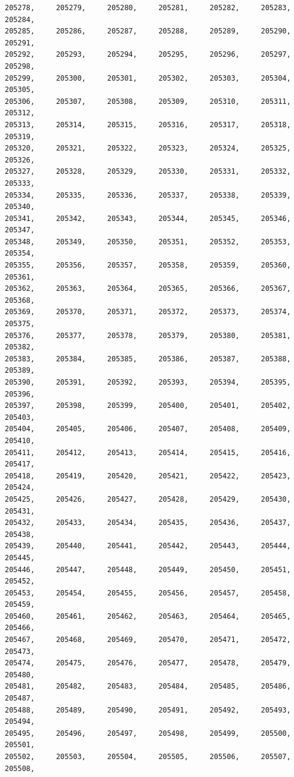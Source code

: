 \documentclass[a4paper,11pt]{report}
\begin{document}
\begin{verbatim}
205278,     205279,     205280,     205281,     205282,     205283,     205284,
205285,     205286,     205287,     205288,     205289,     205290,     205291,
205292,     205293,     205294,     205295,     205296,     205297,     205298,
205299,     205300,     205301,     205302,     205303,     205304,     205305,
205306,     205307,     205308,     205309,     205310,     205311,     205312,
205313,     205314,     205315,     205316,     205317,     205318,     205319,
205320,     205321,     205322,     205323,     205324,     205325,     205326,
205327,     205328,     205329,     205330,     205331,     205332,     205333,
205334,     205335,     205336,     205337,     205338,     205339,     205340,
205341,     205342,     205343,     205344,     205345,     205346,     205347,
205348,     205349,     205350,     205351,     205352,     205353,     205354,
205355,     205356,     205357,     205358,     205359,     205360,     205361,
205362,     205363,     205364,     205365,     205366,     205367,     205368,
205369,     205370,     205371,     205372,     205373,     205374,     205375,
205376,     205377,     205378,     205379,     205380,     205381,     205382,
205383,     205384,     205385,     205386,     205387,     205388,     205389,
205390,     205391,     205392,     205393,     205394,     205395,     205396,
205397,     205398,     205399,     205400,     205401,     205402,     205403,
205404,     205405,     205406,     205407,     205408,     205409,     205410,
205411,     205412,     205413,     205414,     205415,     205416,     205417,
205418,     205419,     205420,     205421,     205422,     205423,     205424,
205425,     205426,     205427,     205428,     205429,     205430,     205431,
205432,     205433,     205434,     205435,     205436,     205437,     205438,
205439,     205440,     205441,     205442,     205443,     205444,     205445,
205446,     205447,     205448,     205449,     205450,     205451,     205452,
205453,     205454,     205455,     205456,     205457,     205458,     205459,
205460,     205461,     205462,     205463,     205464,     205465,     205466,
205467,     205468,     205469,     205470,     205471,     205472,     205473,
205474,     205475,     205476,     205477,     205478,     205479,     205480,
205481,     205482,     205483,     205484,     205485,     205486,     205487,
205488,     205489,     205490,     205491,     205492,     205493,     205494,
205495,     205496,     205497,     205498,     205499,     205500,     205501,
205502,     205503,     205504,     205505,     205506,     205507,     205508,

\end{verbatim}
\end{document}
